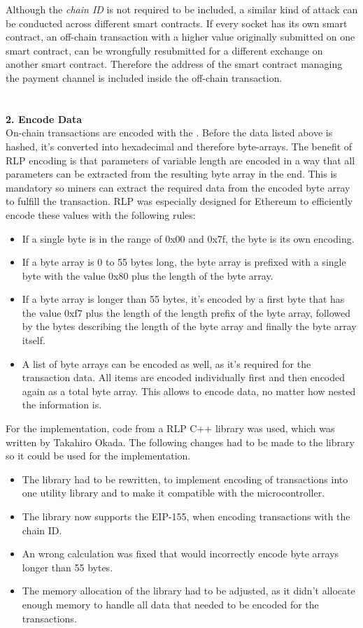 Although the \textit{chain ID} is not required to be included, a similar kind of attack can be conducted across different smart contracts.
If every socket has its own smart contract, an off-chain transaction with a higher value originally submitted on one smart contract, can be wrongfully resubmitted for a different exchange on another smart contract.
Therefore the address of the smart contract managing the payment channel is included inside the off-chain transaction.
\\\\\\
\textbf{2. Encode Data}\\
On-chain transactions are encoded with the \cite{ethereum-yellow-paper}.
Before the data listed above is hashed, it's converted into hexadecimal and therefore byte-arrays.
The benefit of RLP encoding is that parameters of variable length are encoded in a way that all parameters can be extracted from the resulting byte array in the end.
This is mandatory so miners can extract the required data from the encoded byte array to fulfill the transaction.
RLP was especially designed for Ethereum to efficiently encode these values with the following rules: 
\begin{itemize}
  \item If a single byte is in the range of 0x00 and 0x7f, the byte is its own encoding.
  \item If a byte array is 0 to 55 bytes long, the byte array is prefixed with a single byte with the value 0x80 plus the length of the byte array.
  \item If a byte array is longer than 55 bytes, it's encoded by a first byte that has the value 0xf7 plus the length of the length prefix of the byte array, followed by the bytes describing the length of the byte array and finally the byte array itself.
  \item A list of byte arrays can be encoded as well, as it's required for the transaction data.
  All items are encoded individually first and then encoded again as a total byte array.
  This allows to encode data, no matter how nested the information is.
\end{itemize}
For the implementation, code from a RLP C++ library was used, which was written by Takahiro Okada\cite{rlp-lib}.
The following changes had to be made to the library so it could be used for the implementation.
\begin{itemize}
  \item The library had to be rewritten, to implement encoding of transactions into one utility library and to make it compatible with the microcontroller.
  \item The library now supports the EIP-155\cite{eip-155}, when encoding transactions with the chain ID.
  \item An wrong calculation was fixed that would incorrectly encode byte arrays longer than 55 bytes.
  \item The memory allocation of the library had to be adjusted, as it didn't allocate enough memory to handle all data that needed to be encoded for the transactions.
\end{itemize}
